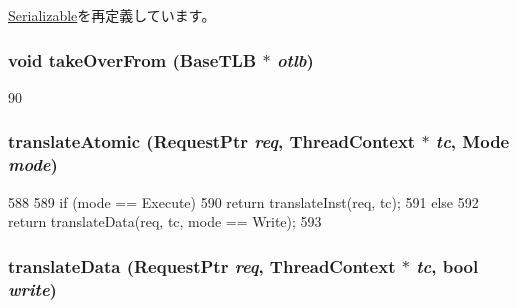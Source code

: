 \hyperlink{classSerializable_ad6272f80ae37e8331e3969b3f072a801}{Serializable}を再定義しています。\hypertarget{classAlphaISA_1_1TLB_a15b6c15c1be2ca4de3e65772a02aa29f}{
\subsubsection[{takeOverFrom}]{\setlength{\rightskip}{0pt plus 5cm}void takeOverFrom ({\bf BaseTLB} $\ast$ {\em otlb})}}
\label{classAlphaISA_1_1TLB_a15b6c15c1be2ca4de3e65772a02aa29f}



\begin{DoxyCode}
90 {}
\end{DoxyCode}
\hypertarget{classAlphaISA_1_1TLB_ad54e01e3c0a1613098a76b7f92e5be93}{
\subsubsection[{translateAtomic}]{ translateAtomic ({\bf RequestPtr} {\em req}, \/  {\bf ThreadContext} $\ast$ {\em tc}, \/  {\bf Mode} {\em mode})}}
\label{classAlphaISA_1_1TLB_ad54e01e3c0a1613098a76b7f92e5be93}



\begin{DoxyCode}
588 {
589     if (mode == Execute)
590         return translateInst(req, tc);
591     else
592         return translateData(req, tc, mode == Write);
593 }
\end{DoxyCode}
\hypertarget{classAlphaISA_1_1TLB_ad54aef66412f77e2a15a621a126dfb52}{
\subsubsection[{translateData}]{ translateData ({\bf RequestPtr} {\em req}, \/  {\bf ThreadContext} $\ast$ {\em tc}, \/  bool {\em write})}}
\label{classAlphaISA_1_1TLB_ad54aef66412f77e2a15a621a126dfb52}


